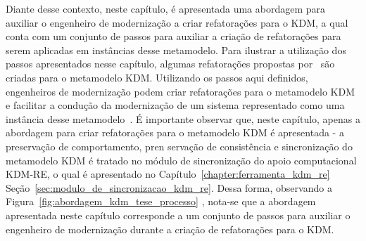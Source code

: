 Diante desse contexto, neste capítulo, é apresentada uma abordagem para auxiliar o engenheiro de modernização a criar refatorações para o KDM, a qual conta com um conjunto de passos para auxiliar a criação de refatorações para serem aplicadas em instâncias desse metamodelo. Para ilustrar a utilização dos passos apresentados nesse capítulo, algumas refatorações propostas por~ são criadas para o metamodelo KDM. Utilizando os passos aqui definidos, engenheiros de modernização podem criar refatorações para o metamodelo KDM e facilitar a condução da modernização de um sistema representado como uma instância desse metamodelo~\cite{durelli_catalogo, durelli_VEM_ferramenta}. É importante observar que, neste capítulo, apenas a abordagem para criar refatorações para o metamodelo KDM é apresentada - a preservação de comportamento, pren servação de consistência e sincronização do metamodelo KDM é tratado no módulo de sincronização do apoio computacional KDM-RE, o qual é apresentado no Capítulo~\ref{chapter:ferramenta_kdm_re}  Seção~\ref{sec:modulo_de_sincronizacao_kdm_re}. Dessa forma, observando a Figura~\ref{fig:abordagem_kdm_tese_processo} , nota-se que a abordagem apresentada neste capítulo corresponde a um conjunto de passos para auxiliar o engenheiro de modernização durante a criação de refatorações para o KDM.








